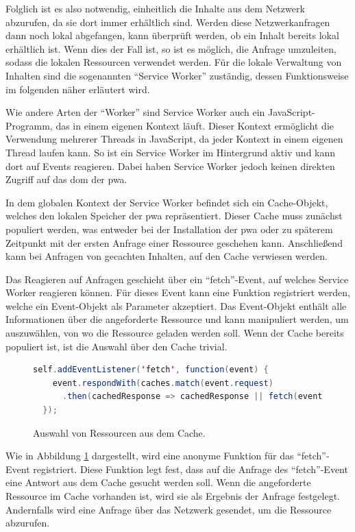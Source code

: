 \documentclass[12pt, parskip=half]{scrartcl}       %
\begin{document}
Folglich ist es also notwendig, einheitlich die Inhalte aus dem Netzwerk abzurufen, da sie dort immer erhältlich sind.
Werden diese Netzwerkanfragen dann noch lokal abgefangen, kann überprüft werden, ob ein Inhalt bereits lokal erhältlich ist.
Wenn dies der Fall ist, so ist es möglich, die Anfrage umzuleiten, sodass die lokalen Ressourcen verwendet werden.
Für die lokale Verwaltung von Inhalten sind die sogenannten \enquote{Service Worker} zuständig, dessen Funktionsweise im folgenden näher erläutert wird.

Wie andere Arten der \enquote{Worker} sind Service Worker auch ein JavaScript-Programm, das in einem eigenen Kontext läuft.
Dieser Kontext ermöglicht die Verwendung mehrerer Threads in JavaScript, da jeder Kontext in einem eigenen Thread laufen kann.
So ist ein Service Worker im Hintergrund aktiv und kann dort auf Events reagieren.
Dabei haben Service Worker jedoch keinen direkten Zugriff auf das \ac{dom} der \ac{pwa}.

In dem globalen Kontext der Service Worker befindet sich ein Cache-Objekt, welches den lokalen Speicher der \ac{pwa} repräsentiert.\cite{w3c_serviceworker_nightly}
Dieser Cache muss zunächst populiert werden, was entweder bei der Installation der \ac{pwa} oder zu späterem Zeitpunkt mit der ersten Anfrage einer Ressource geschehen kann.\cite{ServiceWorker_explained}
Anschließend kann bei Anfragen von gecachten Inhalten, auf den Cache verwiesen werden.

Das Reagieren auf Anfragen geschieht über ein \enquote{fetch}-Event, auf welches Service Worker reagieren können.
Für dieses Event kann eine Funktion registriert werden, welche ein Event-Objekt als Parameter akzeptiert.
Das Event-Objekt enthält alle Informationen über die angeforderte Ressource und kann manipuliert werden, um auszuwählen, von wo die Ressource geladen werden soll.
Wenn der Cache bereits populiert ist, ist die Auswahl über den Cache trivial.

\begin{figure}[h]
\begin{lstlisting}[language=java]
  self.addEventListener('fetch', function(event) {
    event.respondWith(caches.match(event.request)
      .then(cachedResponse => cachedResponse || fetch(event.request)))
  });
\end{lstlisting}
\caption{Auswahl von Ressourcen aus dem Cache.\cite{heise_pwa2}}
\label{fig:js_cache}
\end{figure}

Wie in Abbildung \ref{fig:js_cache} dargestellt, wird eine anonyme Funktion für das \enquote{fetch}-Event registriert.
Diese Funktion legt fest, dass auf die Anfrage des \enquote{fetch}-Event eine Antwort aus dem Cache gesucht werden soll.
Wenn die angeforderte Ressource im Cache vorhanden ist, wird sie als Ergebnis der Anfrage festgelegt.
Andernfalls wird eine Anfrage über das Netzwerk gesendet, um die Ressource abzurufen.
\end{document}
